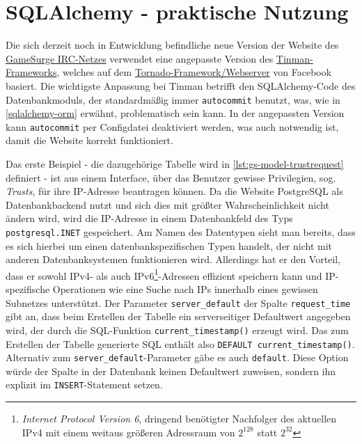 \chapter{SQLAlchemy - praktische Nutzung}

Die sich derzeit noch in Entwicklung befindliche neue Version der Website des
\href{http://www.gamesurge.net}{GameSurge IRC-Netzes} verwendet eine angepasste
Version des \href{https://github.com/gmr/tinman}{Tinman-Frameworks}, welches auf
dem \href{http://www.tornadoweb.org/}{Tornado-Framework/Webserver} von Facebook
basiert. Die wichtigste Anpassung bei Tinman betrifft den SQLAlchemy-Code des
Datenbankmoduls, der standardmäßig immer \texttt{autocommit} benutzt, was, wie in
\autoref{sqlalchemy-orm} erwähnt, problematisch sein kann. In der angepassten
Version kann \texttt{autocommit} per Configdatei deaktiviert werden, was auch
notwendig ist, damit die Website korrekt funktioniert.

Das erste Beispiel - die dazugehörige Tabelle wird in
\autoref{lst:gs-model-trustrequest} definiert - ist aus einem Interface, über
das Benutzer gewisse Privilegien, sog. \emph{Trusts}, für ihre IP-Adresse
beantragen können. Da die Website PostgreSQL als Datenbankbackend nutzt und sich
dies mit größter Wahrscheinlichkeit nicht ändern wird, wird die IP-Adresse in
einem Datenbankfeld des Typs \texttt{postgresql.INET} gespeichert. Am Namen des
Datentypen sieht man bereits, dass es sich hierbei um einen
datenbankspezifischen Typen handelt, der nicht mit anderen Datenbanksystemen
funktionieren wird. Allerdings hat er den Vorteil, dass er sowohl IPv4- als auch
IPv6\footnote{\emph{Internet Protocol Version 6}, dringend benötigter Nachfolger
des aktuellen IPv4 mit einem weitaus größeren Adressraum von $2^{128}$ statt
$2^{32}$}-Adressen effizient speichern kann und IP-spezifische Operationen wie
eine Suche nach IPs innerhalb eines gewissen Subnetzes unterstützt.
Der Parameter \texttt{server\_default} der Spalte \texttt{request\_time} gibt
an, dass beim Erstellen der Tabelle ein serverseitiger Defaultwert angegeben
wird, der durch die SQL-Funktion \texttt{current\_timestamp()} erzeugt wird.
Das zum Erstellen der Tabelle generierte SQL enthält also \texttt{DEFAULT
current\_timestamp()}. Alternativ zum \texttt{server\_default}-Parameter gäbe es
auch \texttt{default}. Diese Option würde der Spalte in der Datenbank keinen
Defaultwert zuweisen, sondern ihn explizit im \texttt{INSERT}-Statement setzen.



